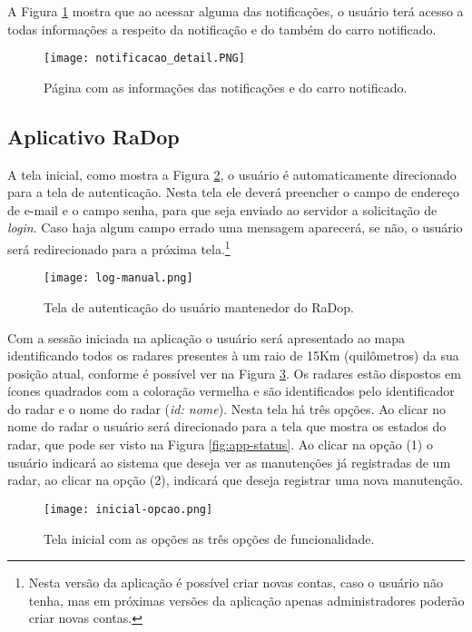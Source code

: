  A Figura \ref{notificacao_detail} mostra que ao acessar alguma das notificações, o usuário terá acesso a todas informações a respeito da notificação e do também do carro notificado. 
 
     \begin{figure}[H]
     \centering
     \texttt{[image: notificacao\_detail.PNG]}
     \caption{Página com as informações das notificações e do carro notificado.}
     \label{notificacao_detail}
 \end{figure}
 
 

\subsection{Aplicativo RaDop}

A tela inicial, como mostra a Figura \ref{fig:app-login}, o usuário é automaticamente direcionado para a tela de autenticação. Nesta tela ele deverá preencher o campo de endereço de e-mail e o campo senha, para que seja enviado ao servidor a solicitação de \textit{login}. Caso haja algum campo errado uma mensagem aparecerá, se não, o usuário será redirecionado para a próxima tela.\footnote{Nesta versão da aplicação é possível criar novas contas, caso o usuário não tenha, mas em próximas versões da aplicação apenas administradores poderão criar novas contas.} 

    \begin{figure}[H]
        \centering
        \texttt{[image: log-manual.png]}
        \caption{Tela de autenticação do usuário mantenedor do RaDop.}
        \label{fig:app-login}
    \end{figure}

Com a sessão iniciada na aplicação o usuário será apresentado ao mapa identificando todos os radares presentes à um raio de 15Km (quilômetros) da sua posição atual, conforme é possível ver na Figura \ref{fig:app-inicial}. Os radares estão dispostos em ícones quadrados com a coloração vermelha e são identificados pelo identificador do radar e o nome do radar (\textit{id: nome}). Nesta tela há três opções. Ao clicar no nome do radar o usuário será direcionado para a tela que mostra os estados do radar, que pode ser visto na Figura \ref{fig:app-status}. Ao clicar na opção (1) o usuário indicará ao sistema que deseja ver as manutenções já registradas de um radar, ao clicar na opção (2), indicará que deseja registrar uma nova manutenção.

    \begin{figure}[H]
        \centering
        \texttt{[image: inicial-opcao.png]}
        \caption{Tela inicial com as opções as três opções de funcionalidade.}
        \label{fig:app-inicial}
    \end{figure}
    
